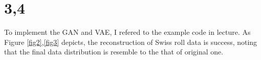 \documentclass[10pt]{article}
\begin{document}
\section*{3,4}
To implement the GAN and VAE, I refered to the example code in lecture.
As Figure \ref{fig2},\ref{fig3} depicts, the reconstruction of Swiss roll data is success, noting that the final data distribution is resemble to the that of original one. 
\begin{figure}[!h]
    \begin{center}
\end{center}
\end{figure}
\end{document}
